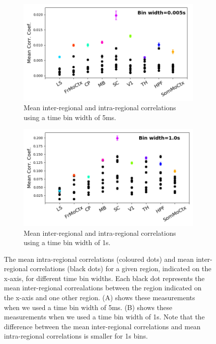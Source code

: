   \begin{figure}[p]
    \begin{subfigure}[h]{\linewidth}
      \centering
      \includegraphics[width=0.7\linewidth]{figures/eight_probe/Krebs_0p005_corr_comp.png}
      \caption{Mean inter-regional and intra-regional correlations using a time bin width of 5ms.}
      \label{fig:short_bin_corr_comp}
    \end{subfigure}
    \begin{subfigure}[h]{\linewidth}
      \centering
      \includegraphics[width=0.7\linewidth]{figures/eight_probe/Krebs_1p0_corr_comp.png}
      \caption{Mean inter-regional and intra-regional correlations using a time bin width of 1s.}
      \label{fig:long_bin_corr_comp}
    \end{subfigure}
    \caption{The mean intra-regional correlations (coloured dots) and mean inter-regional correlations (black dots) for a given region, indicated on the x-axis, for different time bin widths. Each black dot represents the mean inter-regional correalations between the region indicated on the x-axis and one other region. (A) shows these measurements when we used a time bin width of 5ms. (B) shows these measurements when we used a time bin width of 1s. Note that the difference between the mean inter-regional correlations and mean intra-regional correlations is smaller for 1s bins.}
    \label{fig:corr_comps}
  \end{figure}

